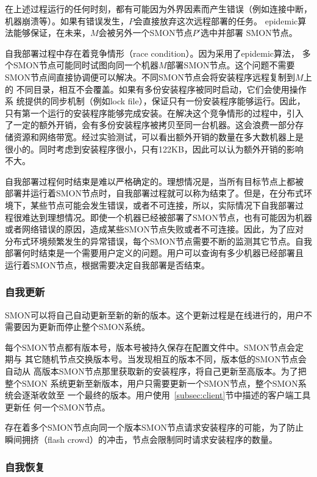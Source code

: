 在上述过程运行的任何时刻，都有可能因为外界因素而产生错误（例如连接中断，
机器崩溃等）。如果有错误发生，$P$会直接放弃这次远程部署的任务。
epidemic算法能够保证，在未来，$M$会被另外一个SMON节点$P'$选中并部署
SMON节点。

自我部署过程中存在着竞争情形（race condition）。因为采用了epidemic算法，
多个SMON节点可能同时试图向同一个机器$M$部署SMON节点。这个问题不需要
SMON节点间直接协调便可以解决。不同SMON节点会将安装程序远程复制到$M$上的
不同目录，相互不会覆盖。如果有多份安装程序被同时启动，它们会使用操作系
统提供的同步机制（例如lock file），保证只有一份安装程序能够运行。因此，
只有第一个运行的安装程序能够完成安装。在解决这个竞争情形的过程中，引入
了一定的额外开销，会有多份安装程序被拷贝至同一台机器。这会浪费一部分存
储资源和网络带宽。经过实验测试，可以看出额外开销的数量在多大数机器上是
很小的。同时考虑到安装程序很小，只有122KB，因此可以认为额外开销的影响
不大。

自我部署过程何时结束是难以严格确定的。理想情况是，当所有目标节点上都被
部署并运行着SMON节点时，自我部署过程就可以称为结束了。但是，在分布式环
境下，某些节点可能会发生错误，或者不可连接，所以，实际情况下自我部署过
程很难达到理想情况。即使一个机器已经被部署了SMON节点，也有可能因为机器
或者网络错误的原因，造成某些SMON节点失败或者不可连接。因此，为了应对
分布式环境频繁发生的异常错误，每个SMON节点需要不断的监测其它节点。自我
部署何时结束是一个需要用户定义的问题。用户可以查询有多少机器已经部署且
运行着SMON节点，根据需要决定自我部署是否结束。

\subsubsection*{自我更新}

SMON可以将自己自动更新至新的新的版本。这个更新过程是在线进行的，用户不
需要因为更新而停止整个SMON系统。

每个SMON节点都有版本号，版本号被持久保存在配置文件中。SMON节点会定期与
其它随机节点交换版本号。当发现相互的版本不同，版本低的SMON节点会自动从
高版本SMON节点那里获取新的安装程序，将自己更新至高版本。为了把整个SMON
系统更新至新版本，用户只需要更新一个SMON节点，整个SMON系统会逐渐收敛至
一个最终的版本。用户使用~\ref{subsec:client}节中描述的客户端工具更新任
何一个SMON节点。

存在着多个SMON节点向同一个版本SMON节点请求安装程序的可能，为了防止
瞬间拥挤（flash crowd）的冲击，节点会限制同时请求安装程序的数量。

\subsubsection*{自我恢复}

